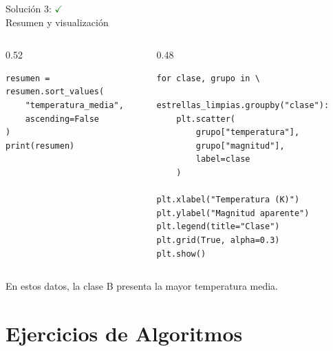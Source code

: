 \documentclass[10pt]{beamer}
\begin{document}
\begin{solutionblock}
\begin{frame}[fragile]{Solución 3: \hfill \textcolor{green}{$\checkmark$} \\ Resumen y visualización}
\begin{columns}
\begin{column}{0.52\textwidth}
\begin{verbatim}
resumen = resumen.sort_values(
    "temperatura_media",
    ascending=False
)
print(resumen)
\end{verbatim}
\end{column}
\begin{column}{0.48\textwidth}
\begin{verbatim}
for clase, grupo in \
        estrellas_limpias.groupby("clase"):
    plt.scatter(
        grupo["temperatura"],
        grupo["magnitud"],
        label=clase
    )

plt.xlabel("Temperatura (K)")
plt.ylabel("Magnitud aparente")
plt.legend(title="Clase")
plt.grid(True, alpha=0.3)
plt.show()
\end{verbatim}
\end{column}
\end{columns}

  En estos datos, la clase B presenta la mayor temperatura media.
\end{frame}
\end{solutionblock}

\section{Ejercicios de Algoritmos}
\end{document}
